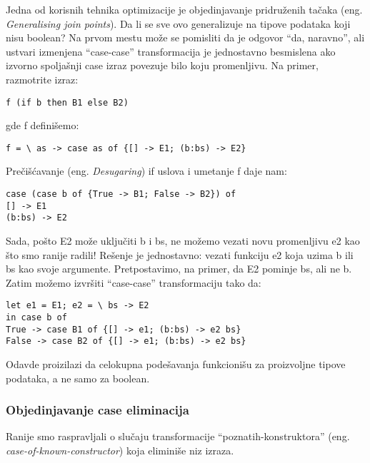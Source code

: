 Jedna od korisnih tehnika optimizacije je objedinjavanje pridruženih tačaka (eng. \emph{Generalising join points}). Da li se sve ovo generalizuje na tipove podataka koji nisu boolean? Na prvom mestu može se pomisliti da je odgovor “da, naravno”, ali ustvari izmenjena “case-case” transformacija je jednostavno besmislena ako izvorno spoljašnji case izraz povezuje bilo koju promenljivu. Na primer, razmotrite izraz:
\begin{verbatim}
f (if b then B1 else B2)
\end{verbatim}
gde f definišemo:
\begin{verbatim}
f = \ as -> case as of {[] -> E1; (b:bs) -> E2}
\end{verbatim}
Prečišćavanje (eng. \emph{Desugaring}) if uslova i umetanje f daje nam:
\begin{verbatim}
case (case b of {True -> B1; False -> B2}) of
[] -> E1
(b:bs) -> E2
\end{verbatim}
Sada, pošto E2 može uključiti b i bs, ne možemo vezati novu promenljivu e2 kao što smo ranije radili! Rešenje je jednostavno: vezati funkciju e2 koja uzima b ili bs kao svoje argumente. Pretpostavimo, na primer, da E2 pominje bs, ali ne b. Zatim možemo izvršiti “case-case” transformaciju tako da:
\begin{verbatim}
let e1 = E1; e2 = \ bs -> E2
in case b of
True -> case B1 of {[] -> e1; (b:bs) -> e2 bs}
False -> case B2 of {[] -> e1; (b:bs) -> e2 bs}
\end{verbatim}

Odavde proizilazi da celokupna podešavanja funkcionišu za proizvoljne tipove podataka, a ne samo za boolean.

\subsubsection{Objedinjavanje case eliminacija}

Ranije smo raspravljali o slučaju transformacije “poznatih-konstruktora” (eng. \emph{case-of-known-constructor}) koja eliminiše niz izraza. 

